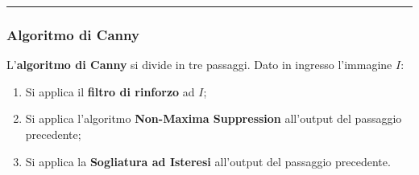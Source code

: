\documentclass[a4paper]{article}
\newcommand{\longline}{\noindent\rule{\textwidth}{0.4pt}}
\begin{document}
	\longline

	\subsubsection{Algoritmo di Canny}
	
	L'\textcolor{Red3}{\textbf{algoritmo di Canny}} si divide in tre passaggi. Dato in ingresso l'immagine $I$:
	\begin{enumerate}
		\item Si applica il \textbf{filtro di rinforzo} ad $I$;
		\item Si applica l'algoritmo \textbf{Non-Maxima Suppression} all'output del passaggio precedente;
		\item Si applica la \textbf{Sogliatura ad Isteresi} all'output del passaggio precedente.
	\end{enumerate}
\end{document}
